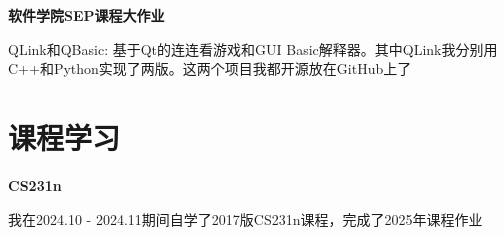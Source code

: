 \documentclass{resume}
\begin{document}
\vspace{1.0ex}

\textbf{软件学院SEP课程大作业}

QLink和QBasic: 基于Qt的连连看游戏和GUI Basic解释器。其中QLink我分别用C++和Python实现了两版。这两个项目我都开源放在GitHub上了

\vspace{0.5ex}



\section{课程学习}
\textbf{CS231n}

我在2024.10 - 2024.11期间自学了2017版CS231n课程，完成了2025年课程作业


%
%
\end{document}
